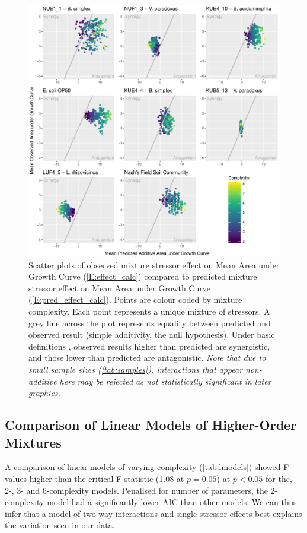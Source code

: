 \documentclass[10pt]{article}
\begin{document}
\begin{figure}[H]
    \centering
    \includegraphics[width = \textwidth]{Scripts/Results/Final_Pipeline/ObservedXPredicted.pdf}
    \caption{Scatter plots of observed mixture stressor effect on Mean Area under Growth Curve (\ref{E:effect_calc}) compared to predicted mixture stressor effect on Mean Area under Growth Curve (\ref{E:pred_effect_calc}). Points are colour coded by mixture complexity. Each point represents a unique mixture of stressors. A grey line across the plot represents equality between predicted and observed result (simple additivity, the null hypothesis). Under basic definitions \cite{Bliss1939}, observed results higher than predicted are synergistic, and those lower than predicted are antagonistic. \textit{Note that due to small sample sizes (\cref{tab:samples}), interactions that appear non-additive here may be rejected as not statistically significant in later graphics.}}
    \label{fig:obsXpred}
\end{figure}

\newpage
\subsection{Comparison of Linear Models of Higher-Order Mixtures}
\label{S:3:6}

A comparison of linear models of varying complexity (\cref{tab:lmodels}) showed F-values higher than the critical F-statistic (1.08 at $p = 0.05$) at $p < 0.05$ for the, 2-, 3- and 6-complexity models. Penalised for number of parameters, the 2-complexity model had a significantly lower AIC than other models. We can thus infer that a model of two-way interactions and single stressor effects best explains the variation seen in our data.
\end{document}
